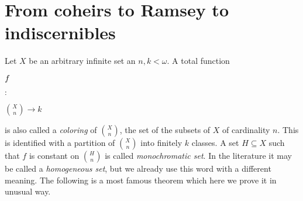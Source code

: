 \documentclass[creche.tex]{subfiles}
\begin{document}


% 



% 



\section{From coheirs to Ramsey to indiscernibles}
\label{Ramsey}

\def\medrel#1{\parbox[t]{6ex}{$\displaystyle\hfil #1$}}
\def\ceq#1#2#3{\parbox[t]{9ex}{$\displaystyle #1$}\medrel{#2}{$\displaystyle #3$}}


Let $X$ be an arbitrary infinite set an $n,k<\omega$. A total function 

\ceq{\hfill f}{:}{{X\choose n}\to k} 

is also called a \emph{coloring\/} of ${X\choose n}$, the set of the subsets of $X$ of cardinality $n$. This is identified with a partition of ${X\choose n}$ into finitely $k$ classes. A set $H\subseteq X$ such that $f$ is constant on ${H\choose n}$ is called \emph{monochromatic set}. In the literature it may be called a \emph{homogeneous set}, but we already use this word with a different meaning. The following is a most famous theorem which here we prove it in unusual way.
\end{document}
